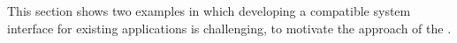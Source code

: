 






This section shows two examples in which developing a compatible system interface for existing applications is challenging, to motivate the approach of the \graphene{} \libos{}.


